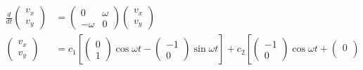 \documentclass{article}
\begin{document}
\begin{align*}
  \frac{d}{d t} \begin{pmatrix}
                  v_x \\
                  v_y
                \end{pmatrix} & = \begin{pmatrix}
                                    0       & \omega \\
                                    -\omega & 0
                                  \end{pmatrix} \begin{pmatrix}
                                                  v_x \\
                                                  v_y
                                                \end{pmatrix}                                                                                                                                \\
  \begin{pmatrix}
    v_x \\
    v_y
  \end{pmatrix}               & = c_1 \left[ \begin{pmatrix}
                                                 0 \\
                                                 1
                                               \end{pmatrix} \cos \omega t - \begin{pmatrix}
                                                                               -1 \\
                                                                               0
                                                                             \end{pmatrix} \sin \omega t \right] + c_2 \left[ \begin{pmatrix}
                                                                                                                                -1 \\
                                                                                                                                0
                                                                                                                              \end{pmatrix} \cos \omega t + \begin{pmatrix}
                                                                                                                                                              0 \\

\end{pmatrix}
\end{align*}
\end{document}
